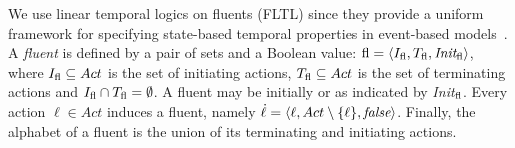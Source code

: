 


We use linear temporal logics on fluents (FLTL) since they provide a uniform framework
for specifying state-based temporal properties in event-based models~\cite{DBLP:conf/sigsoft/GiannakopoulouM03}. 
A \emph{fluent} \fluent is defined by a pair of sets and a Boolean value: $\emph{\emph{fl}} = \langle I_{\emph{\emph{fl}}}, T_{\emph{\emph{fl}}}, \emph{Init}_{\emph{\emph{fl}}} \rangle$, where $I_{\emph{\emph{fl}}}\subseteq Act$ is the set of initiating actions, $T_{\emph{\emph{fl}}}\subseteq Act$ is the set of terminating actions and $I_{\emph{\emph{fl}}}\cap T_{\emph{\emph{fl}}}=\emptyset$. 
A fluent may be initially \true or \false as indicated by \emph{Init}$_{\emph{\emph{fl}}}$. 
Every action $\ell\in Act$ induces a fluent, namely $\dot{\ell}=\langle \ell, Act\setminus \{\ell\}, \emph{false}\rangle$. 
Finally, the alphabet of a fluent is the union of its terminating and initiating actions.

